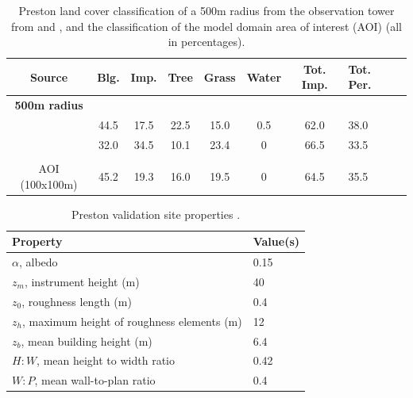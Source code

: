 \documentclass[final,3p,times,authoryear]{elsarticle}
\begin{document}
\begin{table}[!htbp]
\caption
{Preston land cover classification of a 500m radius from the observation tower from \cite{Coutts2007} and \cite{Nury2015}, and the classification of the model domain area of interest (AOI) (all in percentages). \label{tab:expertValues}} 
\begin{tabular}{ |c |c| c | c |c |c |c|p{1.65cm}|p{1.65cm}| } 
\hline \textbf{Source} & \textbf{Blg.}&	\textbf{Imp.}&\textbf{Tree}&\textbf{Grass}	&\textbf{Water}&\textbf{Tot. Imp.}&\textbf{Tot. Per.} \\ \hline
\textbf{500m radius} & & & & & &	&  \\ \hline 
\cite{Coutts2007} &44.5 &17.5&22.5 &15.0 &0.5 &62.0 &38.0	  \\ \hline 
\cite{Nury2015} &32.0 &34.5 &10.1 &23.4 &0 &66.5 &33.5  \\ \hline 
 & & & & & &	&  \\ \hline 
AOI (100x100m) &45.2 &19.3 &16.0 &19.5 &0 &64.5	&35.5  \\ \hline 
\end{tabular} 
\end{table}  
 
\begin{table}[!htbp]
\caption{Preston validation site properties \citep{Coutts2007}. \label{tab:prvalpara}}     
\begin{tabular}{| l | l |}
\hline
\textbf{Property} & \textbf{Value(s)} \\ \hline
$\alpha$, albedo & 0.15  \\ \hline
$z_{m}$, instrument height (m)&  40  \\ \hline
$z_{0}$, roughness length (m)& 0.4  \\ \hline
$z_{h}$, maximum height of roughness elements (m)& 12  \\ \hline
$z_{b}$, mean building height (m)& 6.4  \\ \hline
$H:W$, mean height to width ratio& 0.42  \\ \hline
$W:P$, mean wall-to-plan ratio &0.4  \\ \hline
\end{tabular}
\end{table}
\end{document}
